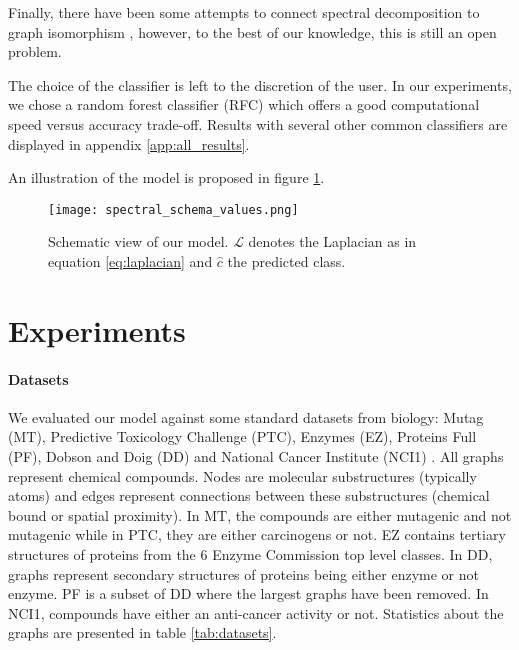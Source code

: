 \documentclass{article}
\begin{document}
Finally, there have been some attempts to connect spectral decomposition to graph isomorphism \citep{van2003graphs, kolla2017spectral}, however, to the best of our knowledge, this is still an open problem.

The choice of the classifier is left to the discretion of the user. In our experiments, we chose a random forest classifier (RFC) which offers a good computational speed versus accuracy trade-off. Results with several other common classifiers are displayed in appendix \ref{app:all_results}. 

An illustration of the model is proposed in figure \ref{fig:model}.

\begin{figure}
    \centering
    \texttt{[image: spectral\_schema\_values.png]}
    \caption{Schematic view of our model. $\mathcal{L}$ denotes the Laplacian as in equation \ref{eq:laplacian} and $\widehat{c}$ the predicted class.}
    \label{fig:model}
\end{figure}

\section{Experiments}
\label{sec:experiments}

\paragraph{Datasets}
We evaluated our model against some standard datasets from biology: Mutag (MT), Predictive Toxicology Challenge (PTC), Enzymes (EZ), Proteins Full (PF), Dobson and Doig (DD) and National Cancer Institute (NCI1) \citep{KKMMN2016}. All graphs represent chemical compounds. Nodes are molecular substructures (typically atoms) and edges represent connections between these substructures (chemical bound or spatial proximity). In MT, the compounds are either mutagenic and not mutagenic while in PTC, they are either carcinogens or not. EZ contains tertiary structures of proteins from the 6 Enzyme Commission top level classes. In DD, graphs represent secondary structures of proteins being either enzyme or not enzyme. PF is a subset of DD where the largest graphs have been removed. In NCI1, compounds have either an anti-cancer activity or not. Statistics about the graphs are presented in table \ref{tab:datasets}.
\end{document}
